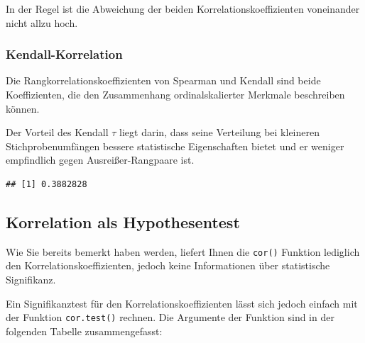 \documentclass[
]{book}
\newenvironment{Shaded}{\begin{snugshade}}{\end{snugshade}}
\newcommand{\AttributeTok}[1]{\textcolor[rgb]{0.77,0.63,0.00}{#1}}
\newcommand{\FunctionTok}[1]{\textcolor[rgb]{0.00,0.00,0.00}{#1}}
\newcommand{\NormalTok}[1]{#1}
\newcommand{\SpecialCharTok}[1]{\textcolor[rgb]{0.00,0.00,0.00}{#1}}
\newcommand{\StringTok}[1]{\textcolor[rgb]{0.31,0.60,0.02}{#1}}
\begin{document}
In der Regel ist die Abweichung der beiden Korrelationskoeffizienten voneinander nicht allzu hoch.

\hypertarget{kendall-korrelation}{%
\subsubsection{Kendall-Korrelation}\label{kendall-korrelation}}

Die Rangkorrelationskoeffizienten von Spearman und Kendall sind beide Koeffizienten, die den Zusammenhang ordinalskalierter Merkmale beschreiben können.

Der Vorteil des Kendall \(τ\) liegt darin, dass seine Verteilung bei kleineren Stichprobenumfängen bessere statistische Eigenschaften bietet und er weniger empfindlich gegen Ausreißer-Rangpaare ist.

\begin{Shaded}
\end{Shaded}

\begin{verbatim}
## [1] 0.3882828
\end{verbatim}

\hypertarget{korrelation-als-hypothesentest}{%
\subsection{Korrelation als Hypothesentest}\label{korrelation-als-hypothesentest}}

Wie Sie bereits bemerkt haben werden, liefert Ihnen die \texttt{cor()} Funktion lediglich den Korrelationskoeffizienten, jedoch keine Informationen über statistische Signifikanz.

Ein Signifikanztest für den Korrelationskoeffizienten lässt sich jedoch einfach mit der Funktion \texttt{cor.test()} rechnen. Die Argumente der Funktion sind in der folgenden Tabelle zusammengefasst:
\end{document}

